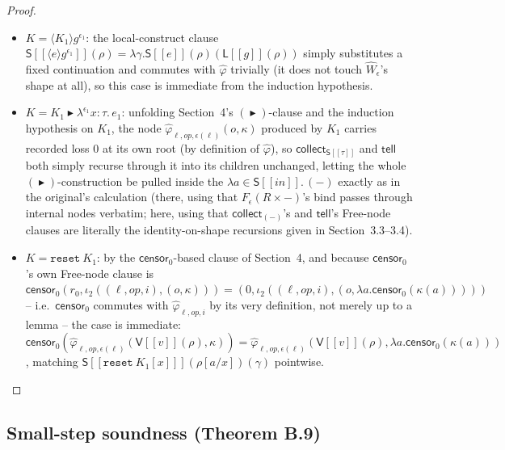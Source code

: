 \documentclass[11pt]{article}
\theoremstyle{plain}
\newcommand{\Ssem}[1]{\mathsf{S}[\![#1]\!]}
\newcommand{\Lsem}[1]{\mathsf{L}[\![#1]\!]}
\newcommand{\Vsem}[1]{\mathsf{V}[\![#1]\!]}
\newcommand{\eps}{\epsilon}
\newcommand{\op}{\mathit{op}}
\newcommand{\then}{\mathrel{\blacktriangleright}}
\newcommand{\loc}[1]{\langle #1 \rangle} %
\newcommand{\tell}{\mathsf{tell}}
\newcommand{\censor}{\mathsf{censor}_0}
\newcommand{\collectX}[1]{\mathsf{collect}_{#1}}
\begin{document}
\begin{proof}
\begin{itemize}
  as required.
\item $K=\loc{K_1}g^{\eps_1}$: the local-construct clause $\Ssem{\loc e g^{\eps_1}}(\rho)=\lambda\gamma.\Ssem e(\rho)(\Lsem g(\rho))$
  simply substitutes a fixed continuation and commutes with $\widehat\varphi$ trivially (it does
  not touch $\widehat W_\eps$'s shape at all), so this case is immediate from the induction
  hypothesis.
\item $K=K_1\then\lambda^{\eps_1}x{:}\tau.\,e_1$: unfolding Section~4's $(\then)$-clause and the
  induction hypothesis on $K_1$, the node $\widehat\varphi_{\ell,\op,\eps(\ell)}(o,\kappa)$
  produced by $K_1$ carries recorded loss $0$ at its own root (by definition of $\widehat\varphi$),
  so $\collectX{\Ssem\tau}$ and $\tell$ both simply recurse through it into its children
  unchanged, letting the whole $(\then)$-construction be pulled inside the
  $\lambda a\in\Ssem{\mathit{in}}.\,(-)$ exactly as in the original's calculation (there, using
  that $F_\eps(R\times-)$'s bind passes through internal nodes verbatim; here, using that
  $\collectX{(-)}$'s and $\tell$'s Free-node clauses are literally the identity-on-shape
  recursions given in Section~3.3--3.4).
\item $K=\mathtt{reset}\ K_1$: by the $\censor$-based clause of Section~4, and because
  $\censor$'s own Free-node clause is $\censor(r_0,\iota_2((\ell,\op,i),(o,\kappa))) =
  (0,\iota_2((\ell,\op,i),(o,\lambda a.\censor(\kappa(a)))))$ -- i.e.\ $\censor$ commutes with
  $\widehat\varphi_{\ell,\op,i}$ by its very definition, not merely up to a lemma -- the case
  is immediate: $\censor(\widehat\varphi_{\ell,\op,\eps(\ell)}(\Vsem v(\rho),\kappa)) =
  \widehat\varphi_{\ell,\op,\eps(\ell)}(\Vsem v(\rho),\lambda a.\censor(\kappa(a)))$, matching
  $\Ssem{\mathtt{reset}\ K_1[x]}(\rho[a/x])(\gamma)$ pointwise.
\end{itemize}
\end{proof}

\subsection{Small-step soundness (Theorem B.9)}
\end{document}
